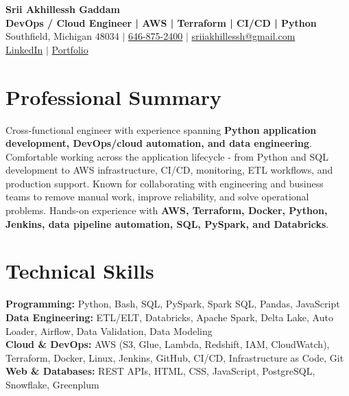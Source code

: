 \documentclass[letterpaper,10pt]{article}
\begin{document}
\fontsize{9.35pt}{10.45pt}\selectfont

\begin{center}
    {\LARGE \textbf{Srii Akhillessh Gaddam}} \\[-1pt]
    \textbf{DevOps / Cloud Engineer | AWS | Terraform | CI/CD | Python} \\[2pt]
    Southfield, Michigan 48034 $|$
    \href{tel:6468752400}{646-875-2400} $|$
    \href{mailto:sriiakhillessh@gmail.com}{sriiakhillessh@gmail.com} \\[1pt]
    \href{https://www.linkedin.com/in/srii-akhiilessh-gaddam-b48668191/}{LinkedIn} $|$
    \href{https://sriiakhillesshg.github.io/portfolio/}{Portfolio}
\end{center}
\vspace{-8pt}

\section{Professional Summary}
\small{Cross-functional engineer with experience spanning \textbf{Python application development, DevOps/cloud automation, and data engineering}. Comfortable working across the application lifecycle - from Python and SQL development to AWS infrastructure, CI/CD, monitoring, ETL workflows, and production support. Known for collaborating with engineering and business teams to remove manual work, improve reliability, and solve operational problems. Hands-on experience with \textbf{AWS, Terraform, Docker, Python, Jenkins, data pipeline automation, SQL, PySpark, and Databricks}.}

\section{Technical Skills}
\small{
\textbf{Programming:} Python, Bash, SQL, PySpark, Spark SQL, Pandas, JavaScript \\
\textbf{Data Engineering:} ETL/ELT, Databricks, Apache Spark, Delta Lake, Auto Loader, Airflow, Data Validation, Data Modeling \\
\textbf{Cloud \& DevOps:} AWS (S3, Glue, Lambda, Redshift, IAM, CloudWatch), Terraform, Docker, Linux, Jenkins, GitHub, CI/CD, Infrastructure as Code, Git \\
\textbf{Web \& Databases:} REST APIs, HTML, CSS, JavaScript, PostgreSQL, Snowflake, Greenplum
}
\end{document}
